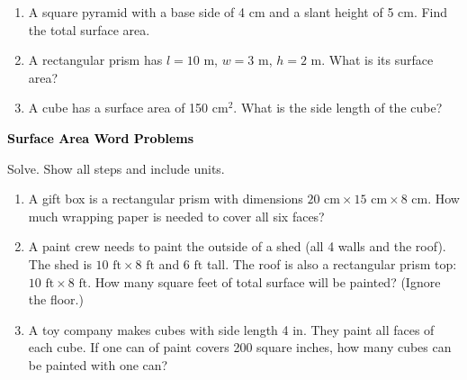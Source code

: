 \documentclass[12pt, letterpaper, fleqn]{article}
\begin{document}
\begin{enumerate}[itemsep=3cm, leftmargin=0.6cm]

\item A square pyramid with a base side of 4 cm and a slant height of 5 cm. Find the total surface area.

\vspace{2.2cm}

\item A rectangular prism has $l = 10\text{ m}$, $w = 3\text{ m}$, $h = 2\text{ m}$. What is its surface area?

\vspace{2.2cm}

\item A cube has a surface area of 150 cm$^2$. What is the side length of the cube?

\vspace{2.5cm}

\end{enumerate}

\newpage

\begin{tcolorbox}[colback=black!10]
\large\textcolor{black}{\textbf{Surface Area Word Problems}}
\end{tcolorbox}

\noindent
Solve. Show all steps and include units.

\vspace{3mm}

\begin{enumerate}[itemsep=2.4cm, leftmargin=0.6cm]

\item A gift box is a rectangular prism with dimensions $20\text{ cm} \times 15\text{ cm} \times 8\text{ cm}$. How much wrapping paper is needed to cover all six faces?

\vspace{2.3cm}

\item A paint crew needs to paint the outside of a shed (all 4 walls and the roof). The shed is $10\text{ ft} \times 8\text{ ft}$ and $6\text{ ft}$ tall. The roof is also a rectangular prism top: $10\text{ ft} \times 8\text{ ft}$. How many square feet of total surface will be painted? (Ignore the floor.)

\vspace{2.3cm}

\item A toy company makes cubes with side length 4 in. They paint all faces of each cube. If one can of paint covers 200 square inches, how many cubes can be painted with one can?

\vspace{2.5cm}

\end{enumerate}
\end{document}
